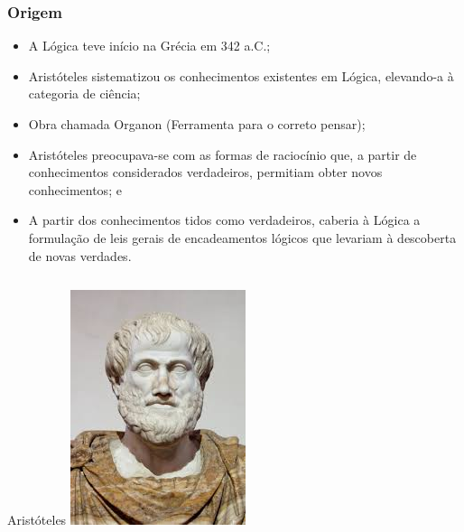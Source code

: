 \documentclass[aspectratio=169]{beamer} %
\begin{document}
\begin{frame}
\frametitle{Origem}

\begin{itemize}
	\item A Lógica teve início na Grécia em 342 a.C.;
	\item Aristóteles sistematizou os conhecimentos existentes em Lógica, elevando-a à categoria de ciência;
	\item Obra chamada Organon (Ferramenta para o correto pensar);
	\item Aristóteles preocupava-se com as formas de raciocínio que, a partir de conhecimentos considerados verdadeiros, permitiam obter novos conhecimentos; e
	\item A partir dos conhecimentos tidos como verdadeiros, caberia à Lógica a formulação de leis gerais de encadeamentos lógicos que levariam à descoberta de novas verdades.
\end{itemize}\vfill

\begin{columns}[c] 
	\begin{exampleblock}{Aristóteles}
		\center
		\includegraphics[scale=0.18]{img/aristoteles}
	\end{exampleblock}
	

\end{columns}
\end{frame}
\end{document}
